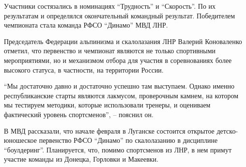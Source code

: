 
Участники состязались в номинациях \enquote{Трудность} и \enquote{Скорость}. По их результатам
и определялся окончательный командный результат. Победителем чемпионата стала
команда РФСО \enquote{Динамо} МВД ЛНР.

Председатель Федерации альпинизма и скалолазания ЛНР Валерий Коноваленко
отметил, что первенство и чемпионат являются не только спортивными
мероприятиями, но и механизмом отбора для участия в соревнованиях более
высокого статуса, в частности, на территории России.

\enquote{Мы достаточно давно и достаточно успешно там выступаем. Однако именно
республиканские старты являются лакмусом, проверочным камнем, на котором мы
тестируем методики, которые использовали тренеры, и оцениваем фактический
уровень спортсменов}, – пояснил он.

В МВД рассказали, что начале февраля в Луганске состоится открытое
детско-юношеское первенство РФСО \enquote{Динамо} по скалолазанию в дисциплине
\enquote{боулдеринг}. Планируется, что, помимо спортсменов из ЛНР, в нем примут участие
команды из Донецка, Горловки и Макеевки.
